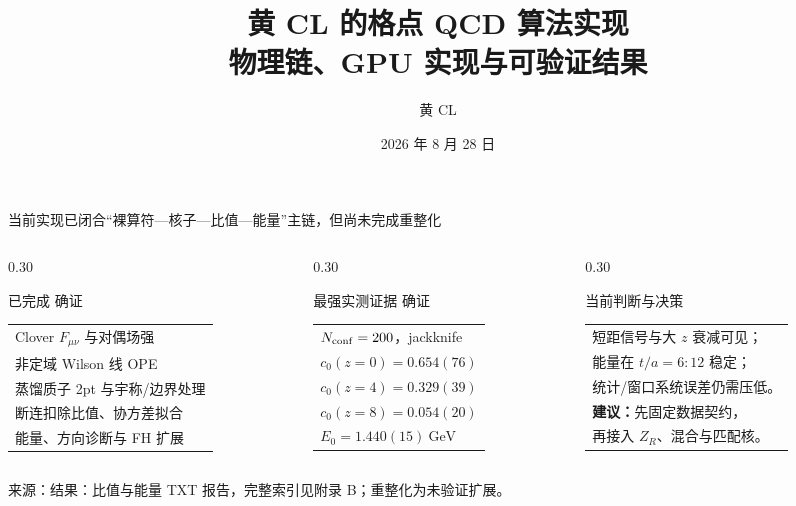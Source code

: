 \documentclass[UTF8,aspectratio=169,11pt]{ctexbeamer}
\title[黄 CL 格点 QCD]{黄 CL 的格点 QCD 算法实现\\物理链、GPU 实现与可验证结果}
\author[黄 CL]{黄 CL}
\institute{PyQCD / \codepath{refer/huangcl}}
\date{2026 年 8 月 28 日}
\newcommand{\source}[1]{%
  \vspace{0.08em}\par{\raggedright\scriptsize\color{muted}来源：#1\par}}
\newcommand{\verified}{\textcolor{evidence}{确证}}
\begin{document}
\begin{frame}[plain]
  \titlepage
\end{frame}

\begin{frame}[t]{当前实现已闭合“裸算符—核子—比值—能量”主链，但尚未完成重整化}
  \begin{columns}[T,totalwidth=\textwidth]
    \begin{column}{0.30\textwidth}
      \begin{block}{已完成 \verified}
        \begin{tabularx}{\linewidth}{@{}>{\raggedright\arraybackslash}X@{}}
          Clover $F_{\mu\nu}$ 与对偶场强\\
          非定域 Wilson 线 OPE\\
          蒸馏质子 2pt 与宇称/边界处理\\
          断连扣除比值、协方差拟合\\
          能量、方向诊断与 FH 扩展
        \end{tabularx}
      \end{block}
    \end{column}
    \begin{column}{0.30\textwidth}
      \begin{block}{最强实测证据 \verified}
        \begin{tabularx}{\linewidth}{@{}>{\raggedright\arraybackslash}X@{}}
          $N_{\rm conf}=200$，jackknife\\
          $c_0(z=0)=0.654(76)$\\
          $c_0(z=4)=0.329(39)$\\
          $c_0(z=8)=0.054(20)$\\
          $E_0=1.440(15)\ \mathrm{GeV}$
        \end{tabularx}
      \end{block}
    \end{column}
    \begin{column}{0.30\textwidth}
      \begin{block}{当前判断与决策}
        \begin{tabularx}{\linewidth}{@{}>{\raggedright\arraybackslash}X@{}}
          短距信号与大 $z$ 衰减可见；\\
          2pt 能量在 $t/a=6\!:\!12$ 稳定；\\
          统计/窗口系统误差仍需压低。\\[0.2em]
          \textbf{建议：}先固定数据契约，\\
          再接入 $Z_R$、混合与匹配核。
        \end{tabularx}
      \end{block}
    \end{column}
  \end{columns}
  \source{结果：比值与能量 TXT 报告，完整索引见附录 B；重整化为未验证扩展。}
\end{frame}
\end{document}
